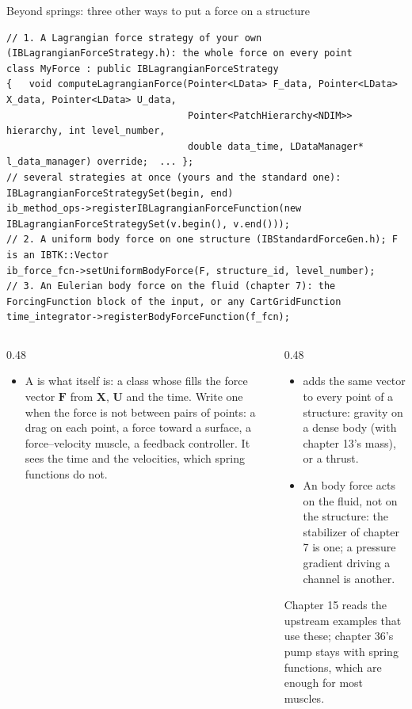 \documentclass[aspectratio=169,11pt]{beamer}
\begin{document}
\begin{frame}[fragile]{Beyond springs: three other ways to put a force on a structure}
\label{fr:other}
\begin{lstlisting}[style=cpptiny]
// 1. A Lagrangian force strategy of your own (IBLagrangianForceStrategy.h): the whole force on every point
class MyForce : public IBLagrangianForceStrategy
{   void computeLagrangianForce(Pointer<LData> F_data, Pointer<LData> X_data, Pointer<LData> U_data,
                                Pointer<PatchHierarchy<NDIM>> hierarchy, int level_number,
                                double data_time, LDataManager* l_data_manager) override;  ... };
// several strategies at once (yours and the standard one): IBLagrangianForceStrategySet(begin, end)
ib_method_ops->registerIBLagrangianForceFunction(new IBLagrangianForceStrategySet(v.begin(), v.end()));
// 2. A uniform body force on one structure (IBStandardForceGen.h); F is an IBTK::Vector
ib_force_fcn->setUniformBodyForce(F, structure_id, level_number);
// 3. An Eulerian body force on the fluid (chapter 7): the ForcingFunction block of the input, or any CartGridFunction
time_integrator->registerBodyForceFunction(f_fcn);
\end{lstlisting}
\begin{columns}[T,onlytextwidth]
\begin{column}{0.48\textwidth}
\scriptsize
\begin{itemize}
  \item A  is what  itself is: a class whose  fills the force vector $\mathbf{F}$ from $\mathbf{X}$, $\mathbf{U}$ and the time. Write one when the force is not between pairs of points: a drag on each point, a force toward a surface, a force--velocity muscle, a feedback controller. It sees the time and the velocities, which spring functions do not.
\end{itemize}
\end{column}
\begin{column}{0.48\textwidth}
\scriptsize
\begin{itemize}
  \item {} adds the same vector to every point of a structure: gravity on a dense body (with chapter 13's mass), or a thrust.
  \item An  body force acts on the fluid, not on the structure: the stabilizer of chapter 7 is one; a pressure gradient driving a channel is another.
\end{itemize}
Chapter 15 reads the upstream examples that use these; chapter 36's pump stays with spring functions, which are enough for most muscles.
\end{column}
\end{columns}
\end{frame}
\end{document}
